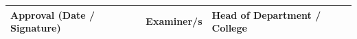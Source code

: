 \begin{center}
	\vfill
	
	\begin{table}[h!]
		\begin{tabular}{|p{52mm}|p{52mm}|p{52mm}|}
			\hline
			\makecell[l{{p{52mm}}}]{\small{Approval (Date / Signature)} \\ ~ \\ ~ \\} &
			\makecell[l{{p{52mm}}}]{\small{Examiner/s} \\ ~ \\ ~ \\} &
			\makecell[l{{p{52mm}}}]{\small{Head of Department / College} \\ ~ \\ ~ \\} \\
			\hline
		\end{tabular}
	\end{table}
\end{center}

\newpage